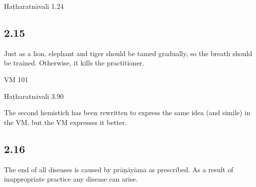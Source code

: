 \begin{ekdosis}
\begin{testimonia}[hp02_014]
Haṭharatnāvalī 1.24

\begin{versinnote}
\end{versinnote}
\end{testimonia}

\begin{philcomm}[hp02_014]
\end{philcomm}

\subsection*{2.15}
\begin{translation}[hp02_015]
Just as a lion, elephant and tiger should be tamed gradually, so the breath should be trained. Otherwise, it kills the practitioner.
\end{translation}

\begin{sources}[hp02_015]
VM 101

\begin{versinnote}
\end{versinnote}
\end{sources}

\begin{testimonia}[hp02_015]
Haṭharatnāvalī 3.90

\begin{versinnote}
\end{versinnote}
\end{testimonia}

\begin{philcomm}[hp02_015]
The second hemistich has been rewritten to express the same idea (and simile) in the VM, but the VM expresses it better.
\end{philcomm}

\subsection*{2.16}
\begin{translation}[hp02_016]
The end of all diseases is caused by prāṇāyāma as prescribed. As a result of inappropriate practice any disease can arise.
\end{translation}


\end{ekdosis}
